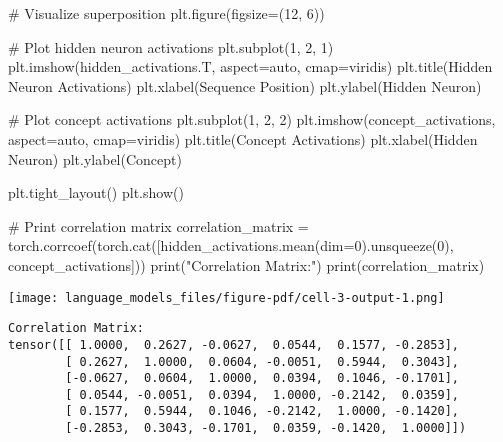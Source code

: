 \documentclass[
  letterpaper,
  DIV=11,
  numbers=noendperiod]{scrreprt}
\newenvironment{Shaded}{\begin{snugshade}}{\end{snugshade}}
\newcommand{\BuiltInTok}[1]{\textcolor[rgb]{0.00,0.23,0.31}{#1}}
\newcommand{\CommentTok}[1]{\textcolor[rgb]{0.37,0.37,0.37}{#1}}
\newcommand{\DecValTok}[1]{\textcolor[rgb]{0.68,0.00,0.00}{#1}}
\newcommand{\NormalTok}[1]{\textcolor[rgb]{0.00,0.23,0.31}{#1}}
\newcommand{\OperatorTok}[1]{\textcolor[rgb]{0.37,0.37,0.37}{#1}}
\newcommand{\StringTok}[1]{\textcolor[rgb]{0.13,0.47,0.30}{#1}}
\begin{document}
\begin{Shaded}
\begin{Highlighting}[]
\CommentTok{\# Visualize superposition}
\NormalTok{plt.figure(figsize}\OperatorTok{=}\NormalTok{(}\DecValTok{12}\NormalTok{, }\DecValTok{6}\NormalTok{))}

\CommentTok{\# Plot hidden neuron activations}
\NormalTok{plt.subplot(}\DecValTok{1}\NormalTok{, }\DecValTok{2}\NormalTok{, }\DecValTok{1}\NormalTok{)}
\NormalTok{plt.imshow(hidden\_activations.T, aspect}\OperatorTok{=}\StringTok{\textquotesingle{}auto\textquotesingle{}}\NormalTok{, cmap}\OperatorTok{=}\StringTok{\textquotesingle{}viridis\textquotesingle{}}\NormalTok{)}
\NormalTok{plt.title(}\StringTok{\textquotesingle{}Hidden Neuron Activations\textquotesingle{}}\NormalTok{)}
\NormalTok{plt.xlabel(}\StringTok{\textquotesingle{}Sequence Position\textquotesingle{}}\NormalTok{)}
\NormalTok{plt.ylabel(}\StringTok{\textquotesingle{}Hidden Neuron\textquotesingle{}}\NormalTok{)}

\CommentTok{\# Plot concept activations}
\NormalTok{plt.subplot(}\DecValTok{1}\NormalTok{, }\DecValTok{2}\NormalTok{, }\DecValTok{2}\NormalTok{)}
\NormalTok{plt.imshow(concept\_activations, aspect}\OperatorTok{=}\StringTok{\textquotesingle{}auto\textquotesingle{}}\NormalTok{, cmap}\OperatorTok{=}\StringTok{\textquotesingle{}viridis\textquotesingle{}}\NormalTok{)}
\NormalTok{plt.title(}\StringTok{\textquotesingle{}Concept Activations\textquotesingle{}}\NormalTok{)}
\NormalTok{plt.xlabel(}\StringTok{\textquotesingle{}Hidden Neuron\textquotesingle{}}\NormalTok{)}
\NormalTok{plt.ylabel(}\StringTok{\textquotesingle{}Concept\textquotesingle{}}\NormalTok{)}

\NormalTok{plt.tight\_layout()}
\NormalTok{plt.show()}

\CommentTok{\# Print correlation matrix}
\NormalTok{correlation\_matrix }\OperatorTok{=}\NormalTok{ torch.corrcoef(torch.cat([hidden\_activations.mean(dim}\OperatorTok{=}\DecValTok{0}\NormalTok{).unsqueeze(}\DecValTok{0}\NormalTok{), concept\_activations]))}
\BuiltInTok{print}\NormalTok{(}\StringTok{"Correlation Matrix:"}\NormalTok{)}
\BuiltInTok{print}\NormalTok{(correlation\_matrix)}
\end{Highlighting}
\end{Shaded}

\texttt{[image: language\_models\_files/figure-pdf/cell-3-output-1.png]}

\begin{verbatim}
Correlation Matrix:
tensor([[ 1.0000,  0.2627, -0.0627,  0.0544,  0.1577, -0.2853],
        [ 0.2627,  1.0000,  0.0604, -0.0051,  0.5944,  0.3043],
        [-0.0627,  0.0604,  1.0000,  0.0394,  0.1046, -0.1701],
        [ 0.0544, -0.0051,  0.0394,  1.0000, -0.2142,  0.0359],
        [ 0.1577,  0.5944,  0.1046, -0.2142,  1.0000, -0.1420],
        [-0.2853,  0.3043, -0.1701,  0.0359, -0.1420,  1.0000]])
\end{verbatim}
\end{document}

